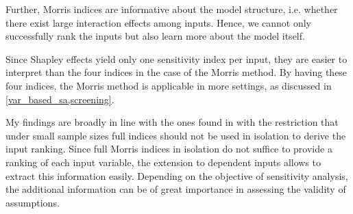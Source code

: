 Further, Morris indices are informative about the model structure, i.e. whether there exist large interaction effects among inputs. Hence, we cannot only successfully rank the inputs but also learn more about the model itself.

Since Shapley effects yield only one sensitivity index per input, they are easier to interpret than the four indices in the case of the Morris method. By having these four indices, the Morris method is applicable in more settings, as discussed in \cref{var_based_sa,screening}.

My findings are broadly in line with the ones found in \citet{GM17} with the restriction that under small sample sizes full indices should not be used in isolation to derive the input ranking. %
Since full Morris indices in isolation do not suffice to provide a ranking of each input variable, the extension to dependent inputs allows to extract this information easily. Depending on the objective of sensitivity analysis, the additional information can be of great importance in assessing the validity of assumptions.
